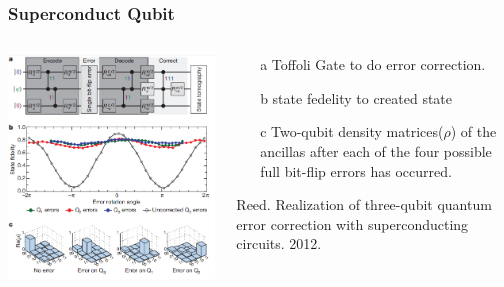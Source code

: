 \documentclass[aspectratio=169,10pt]{beamer}
\begin{document}
\begin{frame}
    \frametitle{Superconduct Qubit}
    \begin{columns}
        \begin{column}{0.45\textwidth}
            \centering
            \includegraphics[width=\columnwidth]{figure/qec3.png}
        \end{column}
        \begin{column}{0.55\textwidth}
            \centering
            \begin{block}{}
                \begin{enumerate}
                    \item[a] Toffoli Gate to do error correction.
                    \item[b] state fedelity to created state
                    \item[c] Two-qubit density matrices($\rho$) of the ancillas after each of the four possible full bit-flip errors has occurred.
                \end{enumerate}
            \end{block}  
            \tiny{Reed. Realization of three-qubit quantum error correction with superconducting circuits. 2012.}
        \end{column}
    \end{columns}
\end{frame}
\end{document}
